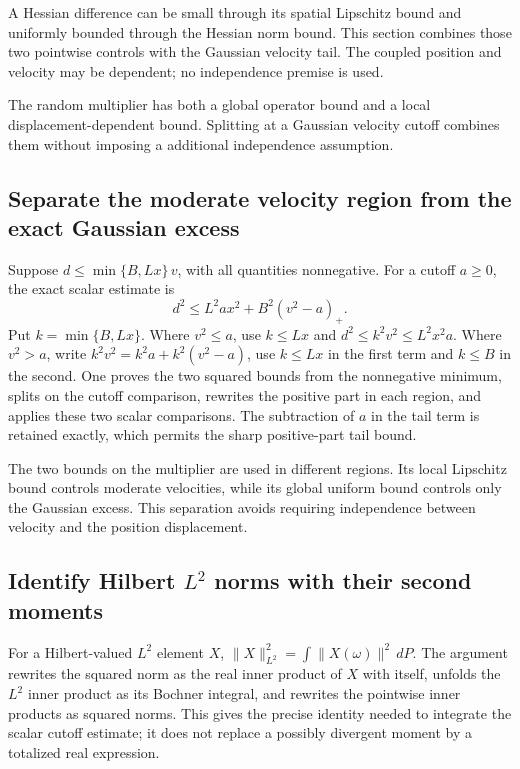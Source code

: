 \documentclass[11pt,a4paper]{report}
\begin{document}
A Hessian difference can be small through its spatial Lipschitz bound and uniformly bounded through the Hessian norm bound. This section combines those two pointwise controls with the Gaussian velocity tail. The coupled position and velocity may be dependent; no independence premise is used.



The random multiplier has both a global operator bound and a local displacement-dependent bound. Splitting at a Gaussian velocity cutoff combines them without imposing a additional independence assumption.

\subsection{\texorpdfstring{Separate the moderate velocity region from the exact Gaussian excess}{Separate the moderate velocity region from the exact Gaussian excess}}
\label{report-step-KineticLangevin-GaussianTruncation-lean-1}


Suppose \(d\le\min\{B,Lx\}\,v\), with all quantities nonnegative. For a cutoff \(a\ge0\), the exact scalar estimate is \[d^2\le L^2ax^2+B^2(v^2-a)_+.\] Put \(k=\min\{B,Lx\}\). Where \(v^2\le a\), use \(k\le Lx\) and \(d^2\le k^2v^2\le L^2x^2a\). Where \(v^2>a\), write \(k^2v^2=k^2a+k^2(v^2-a)\), use \(k\le Lx\) in the first term and \(k\le B\) in the second. One proves the two squared bounds from the nonnegative minimum, splits on the cutoff comparison, rewrites the positive part in each region, and applies these two scalar comparisons. The subtraction of \(a\) in the tail term is retained exactly, which permits the sharp positive-part tail bound.



The two bounds on the multiplier are used in different regions. Its local Lipschitz bound controls moderate velocities, while its global uniform bound controls only the Gaussian excess. This separation avoids requiring independence between velocity and the position displacement.

\subsection{\texorpdfstring{Identify Hilbert \(L^{2}\) norms with their second moments}{Identify Hilbert L² norms with their second moments}}
\label{report-step-KineticLangevin-GaussianTruncation-lean-2}


For a Hilbert-valued \(L^{2}\) element \(X\), \(\|X\|_{L^2}^2=\int\|X(\omega)\|^2\,dP\). The argument rewrites the squared norm as the real inner product of \(X\) with itself, unfolds the \(L^{2}\) inner product as its Bochner integral, and rewrites the pointwise inner products as squared norms. This gives the precise identity needed to integrate the scalar cutoff estimate; it does not replace a possibly divergent moment by a totalized real expression.
\end{document}
